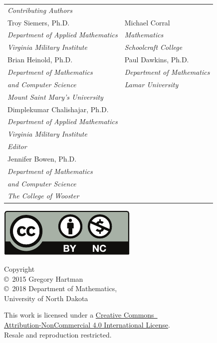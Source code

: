 
\noindent\hspace{-1in}\begin{tabular}{ll}
\textit{Contributing Authors}\\
Troy Siemers, Ph.D. & Michael Corral\\
\emph{\small Department of Applied Mathematics}\qquad\qquad\null & \emph{\small Mathematics}\\
\emph{\small Virginia Military Institute} &
\emph{\small Schoolcraft College}\bigskip\\
Brian Heinold, Ph.D. & Paul Dawkins, Ph.D.\\
\emph{\small Department of Mathematics} & \emph{\small Department of Mathematics}\\
\emph{\small and Computer Science} & \emph{\small Lamar University} \\
\emph{\small Mount Saint Mary's University}\bigskip\\
Dimplekumar Chalishajar, Ph.D.\\
\emph{\small Department of Applied Mathematics}\\
\emph{\small Virginia Military Institute}\bigskip\medskip\\
\textit{Editor}\\
Jennifer Bowen, Ph.D.\\
\emph{\small Department of Mathematics}\\
\emph{\small and Computer Science}\\
\emph{\small The College of Wooster}
\end{tabular}


\noindent\hspace{-1in}\begin{minipage}{2in}
\href{http://creativecommons.org/licenses/by-nc/4.0/}{\includegraphics{figures/raw/by-nc}}
\end{minipage}%
\begin{minipage}{3in}\raggedright
\noindent Copyright\\
\copyright~2015 Gregory Hartman\\
\copyright~2018 Department of Mathematics,\\
University of North Dakota

This work is licensed under a \href{http://creativecommons.org/licenses/by-nc/4.0/}{Creative Commons\iflatexml\ \else\\\fi Attribution-NonCommercial 4.0 International License}.\\
Resale and reproduction restricted.
\end{minipage}

